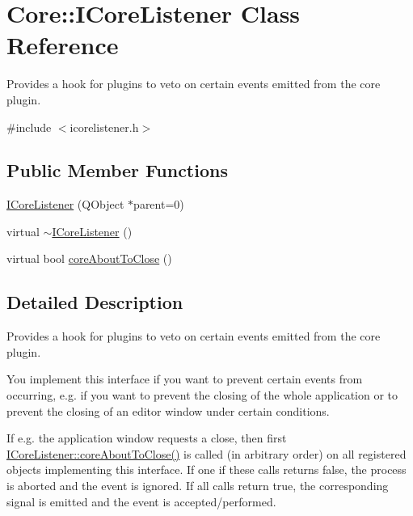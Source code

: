 \hypertarget{class_core_1_1_i_core_listener}{\section{\-Core\-:\-:\-I\-Core\-Listener \-Class \-Reference}
\label{class_core_1_1_i_core_listener}
}


\-Provides a hook for plugins to veto on certain events emitted from the core plugin.  




{\ttfamily \#include $<$icorelistener.\-h$>$}

\subsection*{\-Public \-Member \-Functions}
\begin{DoxyCompactItemize}
\item 
\hyperlink{group___core_plugin_gaae530a3c48fb9849eb9fee0f2616d665}{\-I\-Core\-Listener} (\-Q\-Object $\ast$parent=0)
\item 
virtual \hyperlink{group___core_plugin_ga2dbf8855d21d35851dc3dd795648b50b}{$\sim$\-I\-Core\-Listener} ()
\item 
virtual bool \hyperlink{group___core_plugin_ga234ba638cc5653d3bb183df5c9fe0ce2}{core\-About\-To\-Close} ()
\end{DoxyCompactItemize}


\subsection{\-Detailed \-Description}
\-Provides a hook for plugins to veto on certain events emitted from the core plugin. 

\-You implement this interface if you want to prevent certain events from occurring, e.\-g. if you want to prevent the closing of the whole application or to prevent the closing of an editor window under certain conditions.

\-If e.\-g. the application window requests a close, then first \hyperlink{group___core_plugin_ga234ba638cc5653d3bb183df5c9fe0ce2}{\-I\-Core\-Listener\-::core\-About\-To\-Close()} is called (in arbitrary order) on all registered objects implementing this interface. \-If one if these calls returns false, the process is aborted and the event is ignored. \-If all calls return true, the corresponding signal is emitted and the event is accepted/performed.

